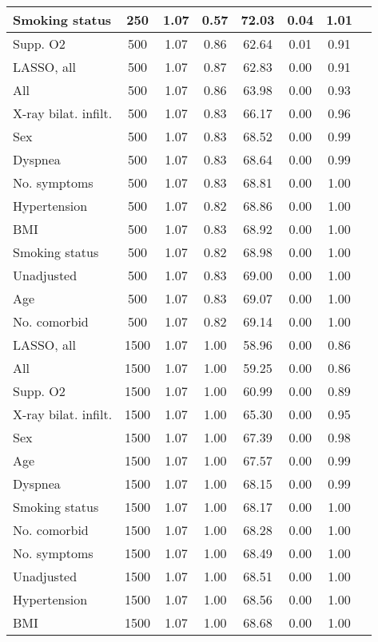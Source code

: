 \documentclass{article}
\begin{document}
{\begin{longtable}{lccccccc}
Smoking status & 250 & 1.07 & 0.57 & 72.03 & 0.04 & 1.01 \\ \midrule 
Supp. O2 & 500 & 1.07 & 0.86 & 62.64 & 0.01 & 0.91 \\ 
LASSO, all & 500 & 1.07 & 0.87 & 62.83 & 0.00 & 0.91 \\ 
All & 500 & 1.07 & 0.86 & 63.98 & 0.00 & 0.93 \\ 
X-ray bilat. infilt. & 500 & 1.07 & 0.83 & 66.17 & 0.00 & 0.96 \\ 
Sex & 500 & 1.07 & 0.83 & 68.52 & 0.00 & 0.99 \\ 
Dyspnea & 500 & 1.07 & 0.83 & 68.64 & 0.00 & 0.99 \\ 
No. symptoms & 500 & 1.07 & 0.83 & 68.81 & 0.00 & 1.00 \\ 
Hypertension & 500 & 1.07 & 0.82 & 68.86 & 0.00 & 1.00 \\ 
BMI & 500 & 1.07 & 0.83 & 68.92 & 0.00 & 1.00 \\ 
Smoking status & 500 & 1.07 & 0.82 & 68.98 & 0.00 & 1.00 \\ 
Unadjusted & 500 & 1.07 & 0.83 & 69.00 & 0.00 & 1.00 \\ 
Age & 500 & 1.07 & 0.83 & 69.07 & 0.00 & 1.00 \\ 
No. comorbid & 500 & 1.07 & 0.82 & 69.14 & 0.00 & 1.00 \\ \midrule 
LASSO, all & 1500 & 1.07 & 1.00 & 58.96 & 0.00 & 0.86 \\ 
All & 1500 & 1.07 & 1.00 & 59.25 & 0.00 & 0.86 \\ 
Supp. O2 & 1500 & 1.07 & 1.00 & 60.99 & 0.00 & 0.89 \\ 
X-ray bilat. infilt. & 1500 & 1.07 & 1.00 & 65.30 & 0.00 & 0.95 \\ 
Sex & 1500 & 1.07 & 1.00 & 67.39 & 0.00 & 0.98 \\ 
Age & 1500 & 1.07 & 1.00 & 67.57 & 0.00 & 0.99 \\ 
Dyspnea & 1500 & 1.07 & 1.00 & 68.15 & 0.00 & 0.99 \\ 
Smoking status & 1500 & 1.07 & 1.00 & 68.17 & 0.00 & 1.00 \\ 
No. comorbid & 1500 & 1.07 & 1.00 & 68.28 & 0.00 & 1.00 \\ 
No. symptoms & 1500 & 1.07 & 1.00 & 68.49 & 0.00 & 1.00 \\ 
Unadjusted & 1500 & 1.07 & 1.00 & 68.51 & 0.00 & 1.00 \\ 
Hypertension & 1500 & 1.07 & 1.00 & 68.56 & 0.00 & 1.00 \\ 
BMI & 1500 & 1.07 & 1.00 & 68.68 & 0.00 & 1.00 \\
\bottomrule
\hline
\end{longtable}
}
\end{document}
